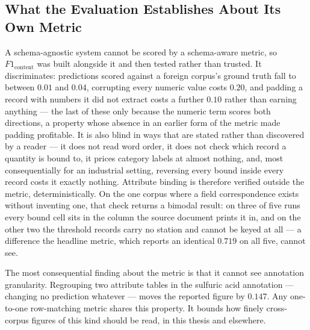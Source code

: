 \documentclass[11pt]{article}
\begin{document}
\subsection{What the Evaluation Establishes About Its Own Metric}
A schema-agnostic system cannot be scored by a schema-aware metric, so
$F1_{\text{content}}$ was built alongside it and then tested rather than trusted.
It discriminates: predictions scored against a foreign corpus's ground truth fall
to between $0.01$ and $0.04$, corrupting every numeric value costs $0.20$, and
padding a record with numbers it did not extract costs a further $0.10$ rather
than earning anything --- the last of these only because the numeric term scores
both directions, a property whose absence in an earlier form of the metric made
padding profitable.
It is also blind in ways that are stated rather than discovered by a reader ---
it does not read word order, it does not check which record a quantity is bound
to, it prices category labels at almost nothing, and, most consequentially for an
industrial setting, reversing every bound inside every record costs it exactly
nothing. Attribute binding is therefore
verified outside the metric, deterministically. On the one corpus where a field
correspondence exists without inventing one, that check returns a bimodal
result: on three of five runs every bound cell sits in the column the source
document prints it in, and on the other two the threshold records carry no
station and cannot be keyed at all --- a difference the headline metric, which
reports an identical $0.719$ on all five, cannot see.

The most consequential finding about the metric is that it cannot see annotation
granularity. Regrouping two attribute tables in the sulfuric acid annotation ---
changing no prediction whatever --- moves the reported figure by $0.147$. Any
one-to-one row-matching metric shares this property. It bounds how finely
cross-corpus figures of this kind should be read, in this thesis and elsewhere.
\end{document}
